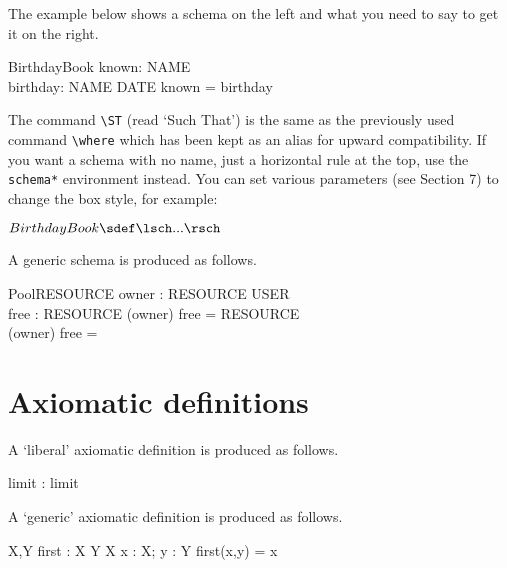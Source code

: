\documentclass[a4paper]{article}
\begin{document}
The example below shows a schema on the left and what you
need to say to get it on the right.

\begin{example}
\begin{schema}{BirthdayBook}
    known: \pset NAME \\
    birthday: NAME \pfun DATE
\ST
    known = \dom birthday
\end{schema}
\end{example}

The command \verb|\ST| (read `Such That') is the same as the previously used
command \verb|\where| which has been kept as an alias for upward compatibility.
If you want a schema with no name, just a horizontal rule at the top,
use the \verb|schema*| environment instead.
You can set various parameters (see Section 7) to change the box style,
for example:

\begin{example}
$BirthdayBook \sdef \lsch ... \rsch$
\end{example}

A generic schema is produced as follows.

\begin{example}
\begin{genschema}{Pool}{RESOURCE}
owner : RESOURCE \pfun USER \\
free : \pset RESOURCE
\ST
(\dom owner) \uni free = RESOURCE \\
(\dom owner) \int free = \emptyset
\end{genschema}
\end{example}

\section{Axiomatic definitions}

A `liberal' axiomatic definition is produced as follows.

\begin{example}
\begin{axdef}
limit : \nat
\ST
limit 
\end{axdef}
\end{example}

A `generic' axiomatic definition is produced as follows.

\begin{example}
\begin{gendef}{X,Y}
first : X \prod Y \tfun X
\ST
\all x : X; y : Y \dot first(x,y) = x
\end{gendef}
\end{example}
\end{document}
